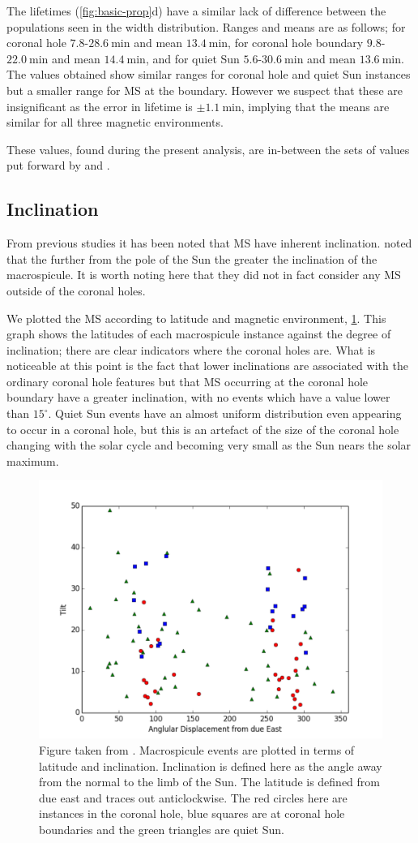 The lifetimes (\cref{fig:basic-prop}d) have a similar lack of difference between the populations seen in the width distribution. Ranges and means are as follows; for coronal hole $7.8$-$28.6\ \textrm{min}$ and mean $13.4\ \textrm{min}$, for coronal hole boundary $9.8$-$22.0\ \textrm{min}$ and mean $14.4\ \textrm{min}$, and for quiet Sun $5.6$-$30.6\ \textrm{min}$ and mean $13.6\ \textrm{min}$. The values obtained show similar ranges for coronal hole and quiet Sun instances but a smaller range for MS at the boundary. However we suspect that these are insignificant as the error in lifetime is $\pm1.1\ \textrm{min}$, implying that the means are similar for all three magnetic environments.

These values, found during the present analysis, are in-between the sets of values put forward by \cite{Bohlin1975} and \cite{Dere89}.

\subsection{Inclination} 
From previous studies it has been noted that MS have inherent inclination. \cite{Bohlin1975} noted that the further from the pole of the Sun the greater the inclination of the macrospicule. It is worth noting here that they did not in fact consider any MS outside of the coronal holes. 

We plotted the MS according to latitude and magnetic environment, \cref{fig:tilt-lat}. This graph shows the latitudes of each macrospicule instance against the degree of inclination; there are clear indicators where the coronal holes are. What is noticeable at this point is the fact that lower inclinations are associated with the ordinary coronal hole features but that MS occurring at the coronal hole boundary have a greater inclination, with no events which have a value lower than $15^{\circ}$. Quiet Sun events have an almost uniform distribution even appearing to occur in a coronal hole, but this is an artefact of the size of the coronal hole changing with the solar cycle and becoming very small as the Sun nears the solar maximum. 


\begin{figure}[t!]
	\centering
	\includegraphics[width=0.5\columnwidth]{Chapter3/Figs/tilt_vs_lat.pdf}	
	\caption{\small Figure taken from \cite{Bennett2015}. Macrospicule events are plotted in terms of latitude and inclination. Inclination is defined here as the angle away from the normal to the limb of the Sun. The latitude is defined from due east and traces out anticlockwise. The red circles here are instances in the coronal hole, blue squares are at coronal hole boundaries and the green triangles are quiet Sun.}
	\label{fig:tilt-lat}
\end{figure}


